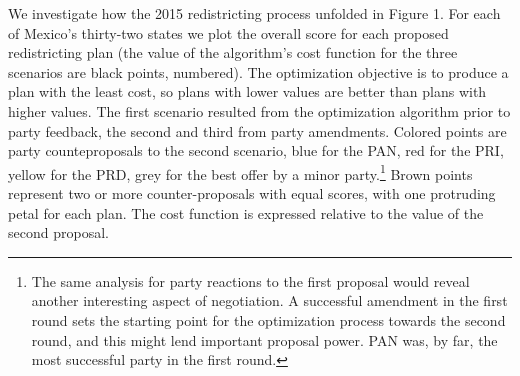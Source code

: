 \documentclass[letter,12pt]{article}
\begin{document}



We investigate how the 2015 redistricting process unfolded in Figure 1. For each of Mexico's thirty-two states we plot the overall score for each proposed redistricting plan (the value of the algorithm's cost function for the three scenarios are black points, numbered). The optimization objective is to produce a plan with the least cost, so plans with lower values are better than plans with higher values. The first scenario resulted from the optimization algorithm prior to party feedback, the second and third from party amendments. Colored points are party counteproposals to the second scenario, blue for the PAN, red for the PRI, yellow for the PRD, grey for the best offer by a minor party.\footnote{The same analysis for party reactions to the first proposal would reveal another interesting aspect of negotiation. A successful amendment in the first round sets the starting point for the optimization process towards the second round, and this might lend important proposal power. PAN was, by far, the most successful party in the first round.} Brown points represent two or more counter-proposals with equal scores, with one protruding petal for each plan. The cost function is expressed relative to the value of the second proposal. 
\end{document}

